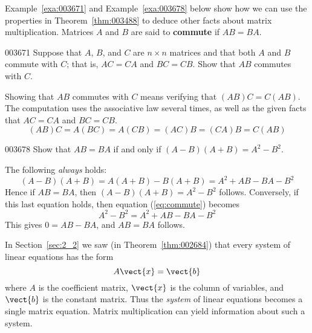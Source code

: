 Example~\ref{exa:003671} and Example~\ref{exa:003678} below show how we can use the properties in Theorem~\ref{thm:003488} to deduce other facts about matrix multiplication. Matrices $A$ and $B$ are said to \textbf{commute} if $AB = BA$.


\begin{example}{}{003671}
Suppose that $A$, $B$, and $C$ are $n \times n$ matrices and that both $A$ and $B$ commute with $C$; that is, $AC = CA$ and $BC = CB$. Show that $AB$ commutes with $C$.

\begin{solution}
  Showing that $AB$ commutes with $C$ means verifying that $(AB)C = C(AB)$. The computation uses the associative law several times, as well as the given facts that $AC = CA$ and $BC = CB$.
\begin{equation*}
(AB)C = A(BC) = A(CB) = (AC)B = (CA)B = C(AB)
\end{equation*}
\end{solution}
\end{example}

\begin{example}{}{003678}
Show that $AB = BA$ if and only if $(A - B)(A + B) = A^{2} - B^{2}$.


\begin{solution}
  The following \textit{always} holds:
\begin{equation} \label{eq:commute}
(A - B)(A + B) = A(A + B) - B(A + B) = A^{2} + AB - BA -B^{2}
\end{equation}
Hence if $AB = BA$, then $(A - B)(A + B) = A^{2} - B^{2}$ follows. Conversely, if this last equation holds, then equation (\ref{eq:commute}) becomes
\begin{equation*}
A^{2} - B^{2} = A^{2} + AB - BA - B^{2}
\end{equation*}
This gives $0 = AB - BA$, and $AB = BA$ follows.
\end{solution}
\end{example}

In Section~\ref{sec:2_2} we saw (in Theorem~\ref{thm:002684}) that every system of linear equations has the form
\begin{equation*}
A\vect{x} = \vect{b}
\end{equation*}
where $A$ is the coefficient matrix, $\vect{x}$ is the column of variables, and $\vect{b}$ is the constant matrix. Thus the \textit{system} of linear equations becomes a single matrix equation. Matrix multiplication can yield information about such a system.


